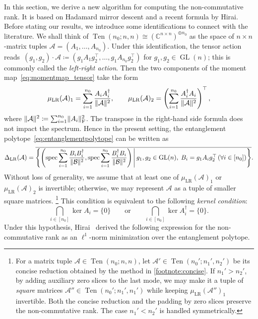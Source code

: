 \documentclass[11pt,letterpaper]{article}
\numberwithin{equation}{section}
\newcommand{\op}{\oplus}
\newcommand{\CC}{\mathbb{C}}
\DeclareMathOperator{\LR}{LR}
\DeclareMathOperator{\spec}{spec}
\DeclareMathOperator{\GL}{GL}
\DeclareMathOperator{\Ten}{Ten}
\DeclarePairedDelimiter\norm{\lVert}{\rVert}
\begin{document}
In this section, we derive a new algorithm for computing the non-commutative rank.
It is based on Hadamard mirror descent and a recent formula by Hirai.
Before stating our results, we introduce some identifications to connect with the literature.
We shall think of $\Ten(n_0; n, n) \cong (\CC^{n \times n})^{\op n_0}$ as the space of $n\times n$-matrix tuples $\mathcal{A} = (A_1, \ldots, A_{n_0})$.
Under this identification, the tensor action reads~$(g_1,g_2) \cdot \mathcal A\coloneqq (g_1A_1g_2^\top, \ldots, g_1A_{n_0}g_2^\top)$ for $g_1,g_2\in\GL(n)$; this is commonly called the \emph{left-right action}.
Then the two components of the moment map~\eqref{eq:momentmap_tensor} take the form
\begin{align*}
    \mu_{\LR}(\mathcal A)_1 = \sum_{i=1}^{n_0} \frac {A_i A_i^\dagger} {\norm{\mathcal A}^2}, \qquad
    \mu_{\LR}(\mathcal A)_2 = \left( \sum_{i=1}^{n_0} \frac {A_i^\dagger A_i } {\norm{\mathcal A}^2} \right)^\top,
\end{align*}
where $\norm{\mathcal A}^2 \coloneqq \sum_{i=1}^{n_0} \norm{A_i}_{\mathrm F}^2$.
The transpose in the right-hand side formula does not impact the spectrum.
Hence in the present setting, the entanglement polytope~\eqref{eq:entanglementpolytope} can be written as
\begin{align*}
    \Delta_{\LR}(\mathcal A) = \overline{\left\{ \left( \spec \sum_{i=1}^{n_0} \frac {B_i B_i^\dagger} {\norm{\mathcal B}^2}, \spec \sum_{i=1}^{n_0} \frac {B_i^\dagger B_i} {\norm{\mathcal B}^2}\right) \,\middle|\, g_1, g_2 \in \GL(n), \; B_i = g_1 A_i g_2^\top \, (\forall i \in[n_0]) \right\}}.
\end{align*}
Without loss of generality, we assume that at least one of $\mu_{\mathrm{LR}}(\mathcal{A})_1$ or $\mu_{\mathrm{LR}}(\mathcal{A})_2$ is invertible; otherwise, we may represent $\mathcal{A}$ as a tuple of smaller square matrices.%
\footnote{For a matrix tuple $\mathcal{A} \in \Ten(n_0; n, n)$, let $\mathcal A' \in \Ten(n_0'; n_1', n_2')$ be its concise reduction obtained by the method in \cref{footnote:concise}.
If $n_1' > n_2'$, by adding auxiliary zero slices to the last mode, we may make it a tuple of \emph{square} matrices $\mathcal A'' \in \Ten(n_0'; n_1', n_1')$ while keeping $\mu_{\mathrm{LR}}(\mathcal{A}'')_1$ invertible.
Both the concise reduction and the padding by zero slices preserve the non-commutative rank.
The case $n_1' < n_2'$ is handled symmetrically.}
This condition is equivalent to the following \emph{kernel condition}:
\begin{equation}\label{eq:kernel-condition}
    \bigcap_{i \in [n_0]}\ker A_i = \{0\} \qquad\text{or}\qquad \bigcap_{i \in [n_0]}\ker A^\dagger_i = \{0\}.
\end{equation}
Under this hypothesis, Hirai~\cite{Hirai-ncrank,Hirai2025} derived the following expression for the non-commutative rank as an $\ell^1$-norm minimization over the entanglement polytope.
\end{document}
